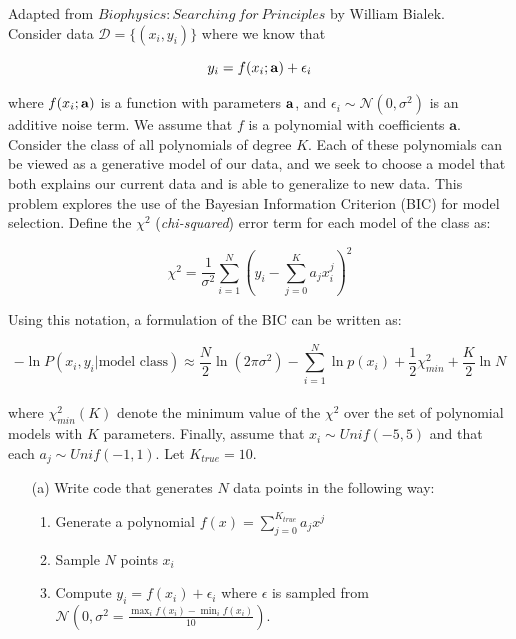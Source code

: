 \documentclass[submit]{harvardml}
\begin{document}
\newpage
\begin{problem}

Adapted from $Biophysics: Searching\ for\ Principles$ by William Bialek.\\

\noindent Consider data $\mathcal{D} = \{(x_i, y_i)\}$ where we know that

    $$y_i = f(x_i ; \bold{a}) + \epsilon_i$$

\noindent where $f(x_i ; \bold{a})$ is a function with parameters $\bold{a}$, and $\epsilon_i \sim \mathcal{N}(0,\sigma^2)$ is an additive noise term.
We assume that $f$ is a polynomial with coefficients $\mathbf{a}$.
Consider the class of all polynomials of degree $K$. Each of these polynomials can be viewed as a generative model of our data, and we seek
to choose a model that both explains our current data and is able to generalize to new data. This problem explores the use of the Bayesian Information Criterion (BIC)
for model selection. Define the $\chi^2$ (\textit{chi-squared}) error term for each model of the class as:

$$\chi^2 =  \frac{1}{\sigma^2} \sum_{i=1}^N \left( y_i - \sum_{j=0}^K a_j x_i^j \right)^2 $$

\noindent Using this notation, a formulation of the BIC can be written as: 

$$-\ln P({x_i,y_i} | \text{model class} ) \approx \frac{N}{2} \ln (2\pi \sigma^2) - \sum_{i=1}^N \ln p(x_i) + \frac{1}{2} \chi^2_{min} + \frac{K}{2} \ln N $$ \\

\noindent where $\chi^2_{min}(K)$ denote the minimum value of the $\chi^2$ over the set of polynomial models with $K$ parameters. 
Finally, assume that $x_i \sim Unif(-5,5)$ and that each $a_j \sim Unif(-1,1)$. Let $K_{true} = 10$.

    \begin{itemize}
    
        \item[(a)] Write code that generates $N$ data points in the following way:
            \begin{enumerate}
                \item Generate a polynomial $f(x) = \sum_{j = 0}^{K_{true}} a_j x^j$ 
                \item Sample $N$ points $x_i$
                \item Compute $y_i = f(x_i) + \epsilon_i$ where $\epsilon$ is sampled from $\mathcal{N}(0, \sigma^2 = \frac{ \max_i f(x_i) - \min_i f(x_i) }{10})$.
            \end{enumerate}
        

\end{itemize}
\end{problem}
\end{document}
